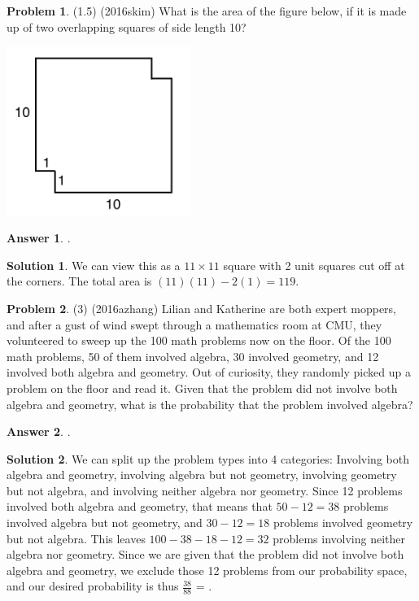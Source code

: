 \documentclass{article}
\theoremstyle{definition}
\newtheorem{problem}{Problem}
\newtheorem*{solution}{Solution}
\newtheorem*{answer}{Answer}
\begin{document}
\begin{problem}
(1.5) (2016skim) What is the area of the figure below, if it is made up of two overlapping squares of side length 10?
\begin{center}
\includegraphics[width=6cm]{squares.png}
\end{center}
\end{problem}

\begin{answer}
.
\end{answer}

\begin{solution}
We can view this as a $11\times11$ square with 2 unit squares cut off at the corners. The total area is $(11)(11)-2(1) = \boxed{119}$.
\end{solution}

\begin{problem}
(3) (2016azhang) Lilian and Katherine are both expert moppers, and after a gust of wind swept through a mathematics room at CMU, they volunteered to sweep up the 100 math problems now on the floor. Of the 100 math problems, 50 of them involved algebra, 30 involved geometry, and 12 involved both algebra and geometry. Out of curiosity, they randomly picked up a problem on the floor and read it. Given that the problem did not involve both algebra and geometry, what is the probability that the problem involved algebra?
\end{problem}

\begin{answer}
.
\end{answer}

\begin{solution}
We can split up the problem types into 4 categories: Involving both algebra and geometry, involving algebra but not geometry, involving geometry but not algebra, and involving neither algebra nor geometry. Since 12 problems involved both algebra and geometry, that means that $50-12 = 38$ problems involved algebra but not geometry, and $30-12 = 18$ problems involved geometry but not algebra. This leaves $100 - 38 - 18 - 12 = 32$ problems involving neither algebra nor geometry. Since we are given that the problem did not involve both algebra and geometry, we exclude those 12 problems from our probability space, and our desired probability is thus $\frac{38}{88}$ = .
\end{solution}
\end{document}
